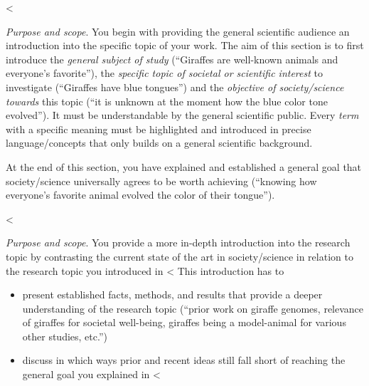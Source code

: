 {{{%
<%

\emph{Purpose and scope}.
You begin with providing the general scientific audience an introduction into the specific topic of your work.
The aim of this section is to first introduce the \emph{general subject of study} (``Giraffes are well-known animals and everyone's favorite''), the \emph{specific topic of societal or scientific interest} to investigate (``Giraffes have blue tongues'') and the \emph{objective of society/science towards} this topic (``it is unknown at the moment how the blue color tone evolved'').
It must be understandable by the general scientific public.
Every \emph{term} with a specific meaning must be highlighted and introduced in precise language/concepts that only builds on a general scientific background.

At the end of this section, you have explained and established a general goal that society/science universally agrees to be worth achieving (``knowing how everyone's favorite animal evolved the color of their tongue'').

<%

\emph{Purpose and scope}.
You provide a more in-depth introduction into the research topic by contrasting the current state of the art in society/science in relation to the research topic you introduced in <%
This introduction has to

\begin{itemize}
  \item present established facts, methods, and results that provide a deeper understanding of the research topic (``prior work on giraffe genomes, relevance of giraffes for societal well-being, giraffes being a model-animal for various other studies, etc.'')
  \item discuss in which ways prior and recent ideas still fall short of reaching the general goal you explained in <%
\end{itemize}

}}}
